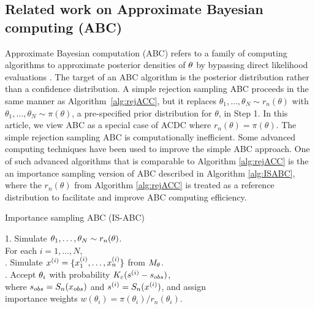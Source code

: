 \subsection{Related work on Approximate Bayesian computing (ABC)}  
Approximate Bayesian computation (ABC)
refers to a family of computing algorithms to approximate posterior densities of ${}{\theta}$ by bypassing direct likelihood evaluations \citep[cf.][]{%
Csillery2010,
Cameron2012,
Peters2012}.
The target of an ABC algorithm is the posterior distribution rather than a confidence distribution. 
A simple rejection sampling ABC proceeds in the same manner as Algorithm~\ref{alg:rejACC}, but it replaces $\theta_1, \ldots, \theta_N \sim r_{n}(\theta)$ with $\theta_1, \ldots, \theta_N \sim  \pi(\theta)$, a pre-specified prior distribution for $\theta$, in Step 1. In this article, we view ABC as a special case of ACDC where $r_{n}(\theta) = \pi(\theta)$. The simple rejection sampling ABC is computationally inefficient. Some advanced computing techniques have been used to improve the simple ABC approach. One of such advanced algorithms that is comparable to Algorithm \ref{alg:rejACC} is the  an importance sampling version of ABC described in
Algorithm \ref{alg:ISABC}, where the $r_{n}(\theta)$ from Algorithm \ref{alg:rejACC} is treated as a reference distribution to facilitate and improve ABC computing efficiency.


\noindent
\hrulefill

\vspace{-3mm}
\begin{algorithm}
\caption{Importance sampling ABC (IS-ABC)} \label{alg:ISABC}
	\begin{tabbing}
	 1. Simulate ${}{\theta}_{1},\ldots,{}{\theta}_{N}\sim r_{n}({}{\theta})$. \\
	 For each $i=1,\ldots,N$, \\
	 . Simulate ${}{x}^{(i)}=\{x_{1}^{(i)},\ldots,x_{n}^{(i)}\}$ from $M_{{}{\theta}}$.\\ 
	 . Accept ${}{\theta}_{i}$ with probability $K_{\varepsilon}(s^{(i)}-s_{\relax obs})$,\\ 
	 \quad where $s_{\relax obs}= S_{n}({}{x}_{\relax obs})$ and $ s^{(i)}=S_{n}({}{x}^{(i)})$, and assign \\ \quad importance weights $w(\theta_i)=\pi(\theta_i)/r_{n}(\theta_i)$.
	\end{tabbing}
\end{algorithm}  

\vspace{-6mm} 

